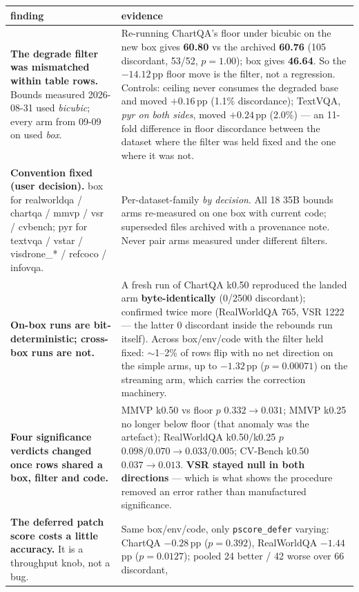 \documentclass[10pt]{article}
\newcommand{\hh}[1]{\textbf{#1}}
\begin{document}
\begin{table}[h]\centering\small
\begin{tabular}{p{}p{}}
\toprule
finding & evidence \\
\midrule
\hh{The degrade filter was mismatched within table rows.} Bounds measured 2026-08-31 used
\emph{bicubic}; every arm from 09-09 on used \emph{box}. &
Re-running ChartQA's floor under bicubic on the new box gives \hh{60.80} vs the archived
\hh{60.76} (105 discordant, 53/52, $p{=}1.00$); box gives \hh{46.64}. So the $-14.12$\,pp floor
move is the filter, not a regression. Controls: ceiling never consumes the degraded base and moved
$+0.16$\,pp (1.1\% discordance); TextVQA, \emph{pyr on both sides}, moved $+0.24$\,pp (2.0\%) ---
an 11-fold difference in floor discordance between the dataset where the filter was held fixed and
the one where it was not. \\
\addlinespace
\hh{Convention fixed (user decision).} box for realworldqa / chartqa / mmvp / vsr / cvbench;
pyr for textvqa / vstar / visdrone\_* / refcoco / infovqa. &
Per-dataset-family \emph{by decision}. All 18 35B bounds arms re-measured on one box with current
code; superseded files archived with a provenance note. Never pair arms measured under different
filters. \\
\addlinespace
\hh{On-box runs are bit-deterministic; cross-box runs are not.} &
A fresh run of ChartQA k0.50 reproduced the landed arm \hh{byte-identically} (0/2500 discordant);
confirmed twice more (RealWorldQA 765, VSR 1222 --- the latter 0 discordant inside the rebounds run
itself). Across box/env/code with the filter held fixed: $\sim$1--2\% of rows flip with no net
direction on the simple arms, up to $-1.32$\,pp ($p{=}0.00071$) on the streaming arm, which carries
the correction machinery. \\
\addlinespace
\hh{Four significance verdicts changed once rows shared a box, filter and code.} &
MMVP k0.50 vs floor $p$ $0.332 \to 0.031$; MMVP k0.25 no longer below floor (that anomaly was the
artefact); RealWorldQA k0.50/k0.25 $p$ $0.098/0.070 \to 0.033/0.005$; CV-Bench k0.50 $0.037 \to
0.013$. \hh{VSR stayed null in both directions} --- which is what shows the procedure removed an
error rather than manufactured significance. \\
\addlinespace
\hh{The deferred patch score costs a little accuracy.} It is a throughput knob, not a bug. &
Same box/env/code, only \texttt{pscore\_defer} varying: ChartQA $-0.28$\,pp ($p{=}0.392$),
RealWorldQA $-1.44$\,pp ($p{=}0.0127$); pooled 24 better / 42 worse over 66 discordant,

\end{tabular}
\end{table}
\end{document}
